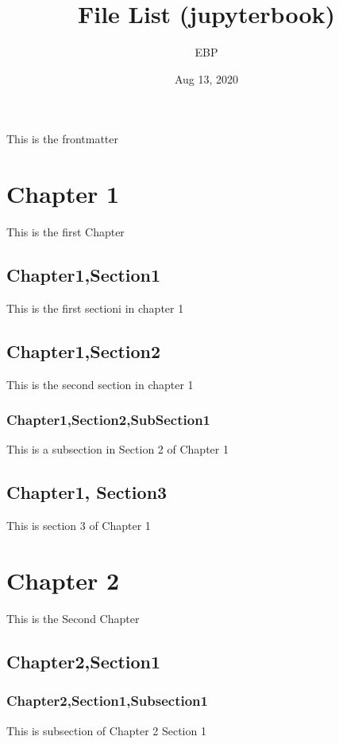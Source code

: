 \documentclass[letterpaper,10pt,english]{sphinxmanual}
\title{File List (jupyterbook)}
\date{Aug 13, 2020}
\author{EBP}
\begin{document}
\pagestyle{empty}
\sphinxmaketitle
\pagestyle{plain}
\sphinxtableofcontents
\pagestyle{normal}
\label{\detokenize{intro::doc}}


This is the frontmatter


\chapter{Chapter 1}
\label{\detokenize{chapter1:chapter-1}}\label{\detokenize{chapter1::doc}}
This is the first Chapter


\section{Chapter1,Section1}
\label{\detokenize{chapter1:chapter1-section1}}
This is the first sectioni in chapter 1


\section{Chapter1,Section2}
\label{\detokenize{chapter1:chapter1-section2}}
This is the second section in chapter 1


\subsection{Chapter1,Section2,SubSection1}
\label{\detokenize{chapter1:chapter1-section2-subsection1}}
This is a subsection in Section 2 of Chapter 1


\section{Chapter1, Section3}
\label{\detokenize{chapter1:chapter1-section3}}
This is section 3 of Chapter 1


\chapter{Chapter 2}
\label{\detokenize{chapter2:chapter-2}}\label{\detokenize{chapter2::doc}}
This is the Second Chapter


\section{Chapter2,Section1}
\label{\detokenize{chapter2:chapter2-section1}}

\subsection{Chapter2,Section1,Subsection1}
\label{\detokenize{chapter2:chapter2-section1-subsection1}}
This is subsection of Chapter 2 Section 1
\end{document}
